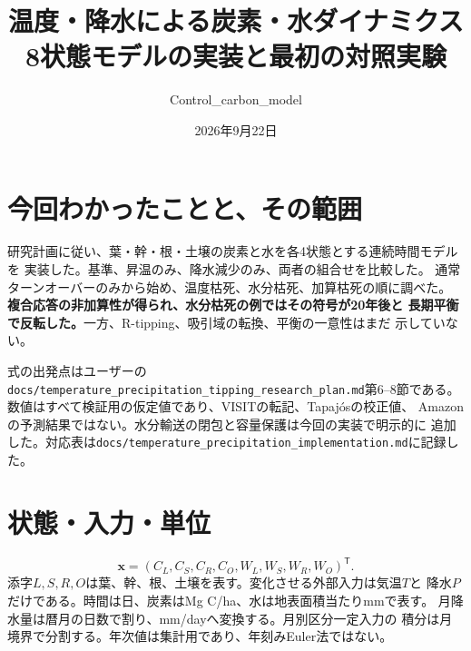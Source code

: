 \documentclass[a4paper,11pt]{ltjsarticle}
\title{温度・降水による炭素・水ダイナミクス\\
\large 8状態モデルの実装と最初の対照実験}
\author{Control\_carbon\_model}
\date{2026年9月22日}
\newcommand{\code}[1]{\nolinkurl{#1}}
\begin{document}
\maketitle

\section{今回わかったことと、その範囲}
研究計画に従い、葉・幹・根・土壌の炭素と水を各4状態とする連続時間モデルを
実装した。基準、昇温のみ、降水減少のみ、両者の組合せを比較した。
通常ターンオーバーのみから始め、温度枯死、水分枯死、加算枯死の順に調べた。
\textbf{複合応答の非加算性が得られ、水分枯死の例ではその符号が20年後と
長期平衡で反転した。}一方、R-tipping、吸引域の転換、平衡の一意性はまだ
示していない。

式の出発点はユーザーの
\code{docs/temperature_precipitation_tipping_research_plan.md}第6--8節である。
数値はすべて検証用の仮定値であり、VISITの転記、Tapajósの校正値、
Amazonの予測結果ではない。水分輸送の閉包と容量保護は今回の実装で明示的に
追加した。対応表は\code{docs/temperature_precipitation_implementation.md}に記録した。

\section{状態・入力・単位}
\[
\bm x=(C_L,C_S,C_R,C_O,W_L,W_S,W_R,W_O)^\mathsf T.
\]
添字$L,S,R,O$は葉、幹、根、土壌を表す。変化させる外部入力は気温$T$と
降水$P$だけである。時間は日、炭素はMg C/ha、水は地表面積当たりmmで表す。
月降水量は暦月の日数で割り、mm/dayへ変換する。月別区分一定入力の
積分は月境界で分割する。年次値は集計用であり、年刻みEuler法ではない。
\end{document}
